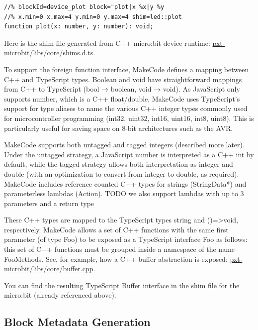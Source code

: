\begin{lstlisting}
//% blockId=device_plot block="plot|x %x|y %y
//% x.min=0 x.max=4 y.min=0 y.max=4 shim=led::plot
function plot(x: number, y: number): void;
\end{lstlisting}

Here is the shim file generated from C++ micro:bit device runtime:
\href{https://github.com/Microsoft/pxt-microbit/blob/master/libs/core/shims.d.ts}{pxt-microbit/libs/core/shims.d.ts}.

To support the foreign function interface, MakeCode defines a mapping between C++ and TypeScript types.
Boolean and void have straightforward mappings from C++ to TypeScript (bool → boolean, void → void). 
As JavaScript only supports number, which is a C++ float/double, MakeCode uses TypeScript's support
for type aliases to name the various C++ integer types commonly used for microcontroller programming
(int32, uint32, int16, uint16, int8, uint8). 
This is particularly useful for saving space on 8-bit architectures such as the AVR. 

MakeCode supports both untagged and tagged integers (described more later).  Under the untagged strategy,
a JavaScript number is interpreted as a C++ int by default, while the tagged strategy allows both
interpretation as integer and double (with an optimization to convert from integer to double, as required).  
MakeCode includes reference counted C++ types for strings (StringData*) and parameterless lambdas (Action).
TODO we also support lambdas with up to 3 parameters and a return type

These C++ types are mapped to the TypeScript types string and ()=>void, respectively.
MakeCode allows a set of C++ functions with the same first parameter (of type Foo) to be
exposed as a TypeScript interface Foo as follows: this set of C++ functions must be grouped
inside a namespace of the name FooMethods.  See, for example, how a C++ buffer abstraction is exposed:
\href{https://github.com/Microsoft/pxt-microbit/blob/master/libs/core/buffer.cpp}{pxt-microbit/libs/core/buffer.cpp}.

You can find the resulting TypeScript Buffer interface in the shim file for the micro:bit
(already referenced above). 

\subsection{Block Metadata Generation}


